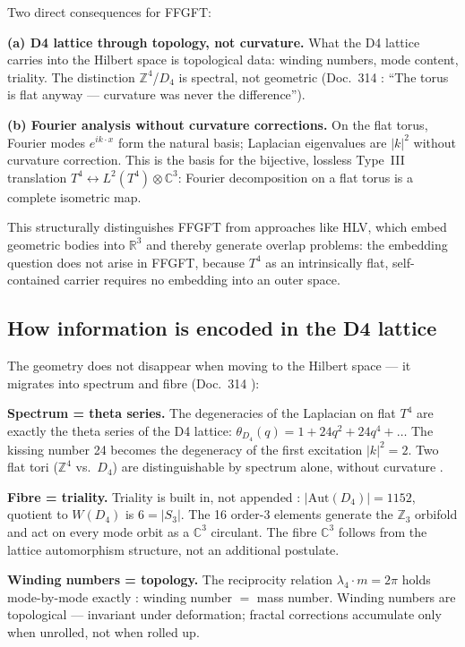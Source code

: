 Two direct consequences for FFGFT:

\textbf{(a) D4 lattice through topology, not curvature.}
What the D4 lattice carries into the Hilbert space is
topological data: winding numbers, mode content, triality.
The distinction $\mathbb{Z}^4$/$D_4$ is spectral, not geometric
(Doc.~314 \K: ``The torus is flat anyway — curvature was never
the difference'').

\textbf{(b) Fourier analysis without curvature corrections.}
On the flat torus, Fourier modes $e^{ik\cdot x}$ form the natural
basis; Laplacian eigenvalues are $|k|^2$ without curvature
correction. This is the basis for the bijective, lossless
Type~III translation $T^4 \leftrightarrow L^2(T^4)\otimes\mathbb{C}^3$:
Fourier decomposition on a flat torus is a complete isometric map.

This structurally distinguishes FFGFT from approaches like HLV,
which embed geometric bodies into $\mathbb{R}^3$ and thereby
generate overlap problems: the embedding question does not arise
in FFGFT, because $T^4$ as an intrinsically flat, self-contained
carrier requires no embedding into an outer space.

\subsection{How information is encoded in the D4 lattice \K}
\label{sec:kodierung}

The geometry does not disappear when moving to the Hilbert space
— it migrates into spectrum and fibre (Doc.~314 \K):

\textbf{Spectrum = theta series.}
The degeneracies of the Laplacian on flat $T^4$ are exactly the
theta series of the D4 lattice: $\theta_{D_4}(q) = 1+24q^2+24q^4+\ldots$
The kissing number 24 becomes the degeneracy of the first excitation
$|k|^2=2$. Two flat tori ($\mathbb{Z}^4$ vs.\ $D_4$) are
distinguishable by spectrum alone, without curvature \K.

\textbf{Fibre = triality.}
Triality is built in, not appended \K: $|\text{Aut}(D_4)| = 1152$,
quotient to $W(D_4)$ is $6 = |S_3|$. The 16 order-3 elements
generate the $\mathbb{Z}_3$ orbifold and act on every mode orbit
as a $\mathbb{C}^3$ circulant. The fibre $\mathbb{C}^3$ follows
from the lattice automorphism structure, not an additional postulate.

\textbf{Winding numbers = topology.}
The reciprocity relation $\lambda_4\cdot m = 2\pi$ holds mode-by-mode
exactly \K: winding number $=$ mass number.
Winding numbers are topological — invariant under deformation;
fractal corrections accumulate only when unrolled, not when rolled up.

